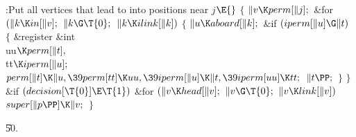 \B{}:Put all vertices that lead to 
into positions near $j$\X${}\E{}$\6
${}\{{}$\1\6
${}\|v\K\\{perm}[\|j];{}$\6
\&{for} ${}(\|k\K\\{in}[\|v];{}$ ${}\|k\G\T{0};{}$ ${}\|k\K\\{ilink}[\|k]){}$\5
${}\{{}$\1\6
${}\|u\K\\{aboard}[\|k];{}$\6
\&{if} ${}(\\{iperm}[\|u]\G\|t){}$\5
${}\{{}$\1\6
\&{register} \&{int} \\{uu}${}\K\\{perm}[\|t],{}$ \\{tt}${}\K\\{iperm}[\|u];{}$%
\7
${}\\{perm}[\|t]\K\|u,\39\\{perm}[\\{tt}]\K\\{uu},\39\\{iperm}[\|u]\K\|t,\39%
\\{iperm}[\\{uu}]\K\\{tt};{}$\6
${}\|t\PP;{}$\6
\4${}\}{}$\2\6
\4${}\}{}$\2\6
\&{if} ${}(\\{decision}[\T{0}]\E\T{1}){}$\1\6
\&{for} ${}(\|v\K\\{head}[\|v];{}$ ${}\|v\G\T{0};{}$ ${}\|v\K\\{link}[\|v]){}$%
\1\5
${}\\{super}[\|p\PP]\K\|v;{}$\2\2\6
\4${}\}{}$\2\par
\U50.\fi

